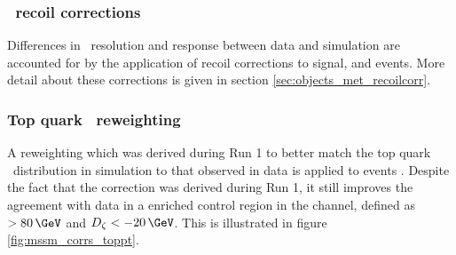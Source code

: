 \subsubsection*{\MET~recoil corrections}
Differences in \MET~resolution and response between data and simulation
are accounted for by the application of recoil corrections
to signal, \Wjets and \Ztautau events. More detail
about these corrections is given in section \ref{sec:objects_met_recoilcorr}.
\subsubsection*{Top quark \pT~reweighting}
A reweighting which was derived during Run 1
to better match the top quark \pT~distribution in simulation
to that observed in data is applied to \ttbar events \cite{topptrwt}. Despite
the fact that the correction was derived during Run 1, it still
improves the agreement with data in a \ttbar enriched
control region in the \emu channel, defined as 
\MET~$>80\,\GeV$ and $D_{\zeta}<-20\,\GeV$. This
is illustrated in figure \ref{fig:mssm_corrs_toppt}. 
